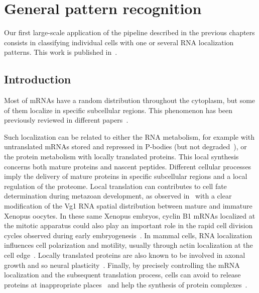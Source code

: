 \section{General pattern recognition}
\label{sec:general_pattern_recognition}

Our first large-scale application of the pipeline described in the previous chapters consists in classifying individual cells with one or several \ac{RNA} localization patterns.
This work is published in~\cite{CHOUAIB_2020}.

\subsection{Introduction}
\label{subsec:introduction_general_pattern}

Most of \ac{mRNA}s have a random distribution throughout the cytoplasm, but some of them localize in specific subcellular regions.
This phenomenon has been previously reviewed in different papers~\cite{Blower_2013, Jung_2014, Eliscovich_2017, Bovaird_2018}.

Such localization can be related to either the \ac{RNA} metabolism, for example with untranslated \ac{mRNA}s stored and repressed in \ac{P-bodies} (but not degraded~\cite{Hubstenberger_2017}), or the protein metabolism with locally translated proteins.
This local synthesis concerns both mature proteins and nascent peptides.
Different cellular processes imply the delivery of mature proteins in specific subcellular regions and a local regulation of the proteome.
Local translation can contributes to cell fate determination during metazoan development, as observed in~\cite{melton_translocation_1987} with a clear modification of the Vg1 \ac{RNA} spatial distribution between mature and immature Xenopus oocytes.
In these same Xenopus embryos, cyclin B1 \ac{mRNA}s localized at the mitotic apparatus could also play an important role in the rapid cell division cycles observed during early embryogenesis~\cite{Groisman_2000}.
In mammal cells, \ac{RNA} localization influences cell polarization and motility, usually through actin localization at the cell edge~\cite{Lawrence_1986}.
Locally translated proteins are also known to be involved in axonal growth and so neural plasticity~\cite{VanDriesche_2018}.
Finally, by precisely controlling the \ac{mRNA} localization and the subsequent translation process, cells can avoid to release proteins at inappropriate places~\cite{Muller_myelin_2013} and help the synthesis of protein complexes~\cite{pichon_visualization_2016}.

